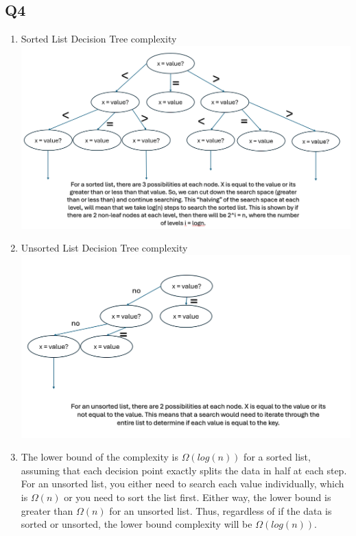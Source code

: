 \documentclass{article}
\begin{document}
\subsection*{Q4}
\begin{enumerate}[label=(\alph*)]
    \item Sorted List Decision Tree complexity
    \subitem \includegraphics[width=1\textwidth]{sorted.png}

    \item Unsorted List Decision Tree complexity
    \subitem \includegraphics[width=1\textwidth]{unsorted.png}

    \item The lower bound of the complexity is $\Omega(log(n))$ for a sorted list, assuming that each decision point exactly splits the data in half at each step. For an unsorted list, you either need to search each value individually, which is $\Omega(n)$ or you need to sort the list first. Either way, the lower bound is greater than $\Omega(n)$ for an unsorted list. Thus, regardless of if the data is sorted or unsorted, the lower bound complexity will be $\Omega(log(n))$.
\end{enumerate}
\end{document}
